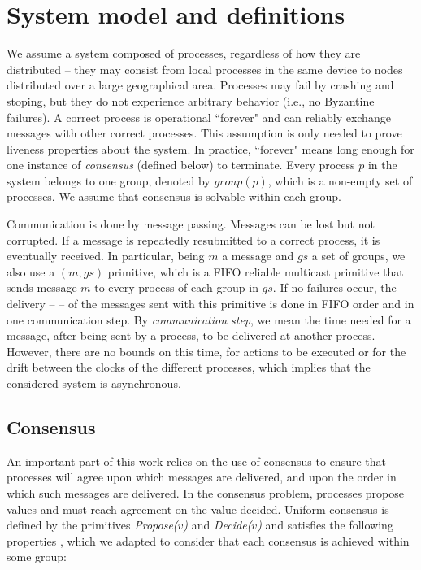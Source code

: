 \documentclass[times, 10pt]{article}
\begin{document}
\section{System model and definitions}
\label{sec:model}

We assume a system composed of processes, regardless of how they are distributed -- they may consist from local processes in the same device to nodes distributed over a large geographical area. Processes may fail by crashing and stoping, but they do not experience arbitrary behavior (i.e., no Byzantine failures). A correct process is operational ``forever" and can reliably exchange messages with other correct processes. This assumption is only needed to prove liveness properties about the system. In practice, ``forever" means long enough for one instance of \emph{consensus} (defined below) to terminate. Every process $p$ in the system belongs to one group, denoted by $group(p)$, which is a non-empty set of processes. We assume that consensus is solvable within each group.

Communication is done by message passing. %
Messages can be lost but not corrupted. If a message is repeatedly resubmitted to a correct process, it is eventually received. In particular, being $m$ a message and $gs$ a set of groups, we also use a \textit{\rmc{}$(m,gs)$} primitive, which is a FIFO reliable multicast primitive that sends message $m$ to every process of each group in $gs$. If no failures occur, the delivery -- \textit{\rmd} -- of the messages sent with this primitive is done in FIFO order and in one communication step. By \emph{communication step}, we mean the time needed for a message, after being sent by a process, to be delivered at another process. However, there are no bounds on this time, for actions to be executed or for the drift between the clocks of the different processes, which implies that the considered system is asynchronous.

\subsection{Consensus}

An important part of this work relies on the use of consensus to ensure that processes will agree upon which messages are delivered, and upon the order in which such messages are delivered. In the consensus problem, processes propose values and must reach agreement on the value decided. Uniform consensus is defined by the primitives \textit{Propose($v$)} and \textit{Decide($v$)} and satisfies the following properties \cite{hadzilacos1993ftb}, which we adapted to consider that each consensus is achieved within some group:
\end{document}
